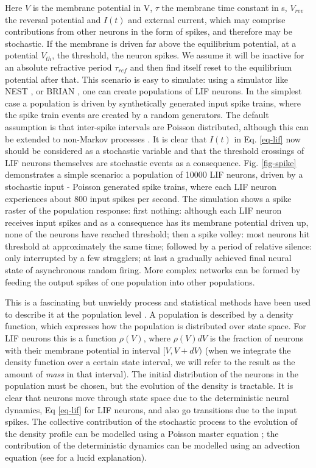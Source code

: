 \documentclass[10pt]{article}
\begin{document}
Here $V$ is the membrane potential in V, $\tau$ the membrane time constant in s, $V_{rev}$ the reversal potential and $I(t)$ and external current, which may comprise contributions from other neurons in the form of spikes, and therefore may be stochastic.
If the membrane is driven far above the equilibrium potential, at a potential $V_{th}$, the threshold, the neuron spikes.
We assume it will be inactive for an absolute refractive period $\tau_{ref}$ and then find itself reset to the equilibrium potential after that.  
This scenario is easy to simulate: using a simulator like NEST \cite{gewaltig2007nest}, or BRIAN \cite{stimberg2014equation}, one can create populations of LIF neurons.
In the simplest case a population is driven by synthetically generated input spike trains, where the spike train events are created by a random generators.
The default assumption is that inter-spike intervals are Poisson distributed, although this can be extended to non-Markov processes \cite{lai2017population}.
It is clear that $I(t)$ in Eq. \ref{eq-lif} now should be considered as a stochastic variable and that the threshold crossings of LIF neurons themselves are stochastic events as a consequence.
Fig. \ref{fig-spike}  demonstrates a simple scenario: a population of 10000 LIF neurons, driven by a stochastic input - Poisson generated spike trains, where each LIF neuron experiences about 800 input spikes per second.
The simulation shows a spike raster of the population response:
first nothing: although each LIF neuron receives input spikes and as a consequence has its membrane potential driven up, none of the neurons have reached threshold;
then a spike volley: most neurons hit threshold at approximately the same time;
followed by a period of relative silence: only interrupted by a few stragglers;
at last a gradually achieved final neural state of asynchronous random firing.
More complex networks can be formed by feeding the output spikes of one population into other populations.

This is a fascinating but unwieldy process and statistical methods have been used to describe it at the population level \cite{stein1996,knight1972,omurtag2000simulation}.
A population is described by a density function, which expresses how the population is distributed over state space.
For LIF neurons this is a function $\rho(V)$, where $\rho(V)dV$ is the fraction of neurons with their membrane potential in interval $[V, V + dV)$ (when we integrate the density function over a certain state interval, we will refer to the  result as  the amount of \emph{mass} in that interval).
The initial distribution of the neurons in the population must be chosen, but the evolution of the density is tractable.
It is clear that neurons move through state space due to the deterministic neural dynamics, Eq \ref{eq-lif} for LIF neurons, and also go transitions due to the input spikes.
The collective contribution of the stochastic process to the evolution of the density profile can be  modelled using a Poisson master equation \cite{gardiner}; the contribution of the deterministic dynamics  can be modelled using an advection equation (see \cite{omurtag2000simulation} for a lucid explanation). 
\end{document}
